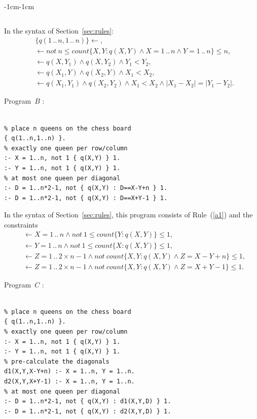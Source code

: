 \documentclass[11pt]{article}
\def\ar{\leftarrow}
\newcommand{\co}{\ensuremath{\mathit{count}}}
\newcommand{\no}{\ensuremath{\mathit{not}}}
\begin{document}
\begin{adjustwidth}{-1cm}{-1cm}
\begin{verbatim}
\end{verbatim}

In the syntax of Section~\ref{sec:rules}:
\begin{align}
& \{q(1\,..\,n,1\,..\,n)\}\ar,\label{a1}\\
& \ar \no\ n\leq  \co\{ X,Y : q(X,Y) \land X = 1\,..\,n \land Y = 1\,..\,n \}
  \leq n,
  \label{a2}\\
& \ar q(X,Y_1) \land q(X,Y_2) \land Y_1 < Y_2,\label{a3}\\
& \ar q(X_1,Y) \land q(X_2,Y) \land X_1 < X_2,\label{a4}\\
& \ar q(X_1,Y_1) \land q(X_2,Y_2) \land X_1 < X_2 \land |X_1-X_2| = |Y_1-Y_2|.
  \label{a5}
\end{align}

Program~$B$ \cite[Table~3]{geb11b}:
\begin{verbatim}

% place n queens on the chess board
{ q(1..n,1..n) }.
% exactly one queen per row/column
:- X = 1..n, not 1 { q(X,Y) } 1.
:- Y = 1..n, not 1 { q(X,Y) } 1.
% at most one queen per diagonal
:- D = 1..n*2-1, not { q(X,Y) : D==X-Y+n } 1.
:- D = 1..n*2-1, not { q(X,Y) : D==X+Y-1 } 1.

\end{verbatim}

In the syntax of Section~\ref{sec:rules}, this program
consists of Rule~(\ref{a1}) and the constraints
\begin{align}
&\ar X = 1\,..\,n \land \no\ 1\leq \co\{ Y : q(X,Y) \} \leq 1,\label{b2}\\
& \ar Y = 1\,..\,n \land \no\ 1\leq \co\{ X : q(X,Y) \} \leq 1,\label{b3}\\
& \ar Z = 1\,..\,2\times n-1
  \land \no\   \co\{ X,Y : q(X,Y) \land Z = X-Y+n \} \leq  1,
  \label{b4}\\
& \ar Z = 1\,..\,2\times n-1
  \land \no\   \co\{ X,Y : q(X,Y) \land Z = X+Y-1 \} \leq  1.
  \label{b5}
\end{align}

Program~$C$ \cite[Table~4]{geb11b}:
\begin{verbatim}

% place n queens on the chess board
{ q(1..n,1..n) }.
% exactly one queen per row/column
:- X = 1..n, not 1 { q(X,Y) } 1.
:- Y = 1..n, not 1 { q(X,Y) } 1.
% pre-calculate the diagonals
d1(X,Y,X-Y+n) :- X = 1..n, Y = 1..n.
d2(X,Y,X+Y-1) :- X = 1..n, Y = 1..n.
% at most one queen per diagonal
:- D = 1..n*2-1, not { q(X,Y) : d1(X,Y,D) } 1.
:- D = 1..n*2-1, not { q(X,Y) : d2(X,Y,D) } 1.


\end{verbatim}
\end{adjustwidth}
\end{document}
